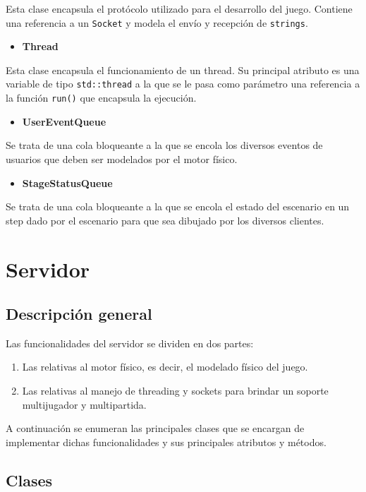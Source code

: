 \documentclass[a4paper]{article}
\begin{document}
Esta clase encapsula el protócolo utilizado para el desarrollo del juego. Contiene una referencia a un \texttt{Socket} y modela el envío y recepción de \texttt{strings}.

\begin{itemize}
	\item \textbf{Thread}
\end{itemize}

Esta clase encapsula el funcionamiento de un thread. Su principal atributo es una variable de tipo \texttt{std::thread} a la que se le pasa como parámetro una
referencia a la función \texttt{run()} que encapsula la ejecución.

\begin{itemize}
	\item \textbf{UserEventQueue}
\end{itemize}

Se trata de una cola bloqueante a la que se encola los diversos eventos de usuarios que deben ser modelados por el motor físico.

\begin{itemize}
	\item \textbf{StageStatusQueue}
\end{itemize}

Se trata de una cola bloqueante a la que se encola el estado del escenario en un step dado por el escenario para que sea dibujado por los diversos clientes.

\section{Servidor}

\subsection{Descripción general}
Las funcionalidades del servidor se dividen en dos partes:
\begin{enumerate}
	\item Las relativas al motor físico, es decir, el modelado físico del juego.
	\item Las relativas al manejo de threading y sockets para brindar un soporte multijugador y multipartida.
\end{enumerate}

A continuación se enumeran las principales clases que se encargan de implementar dichas funcionalidades y sus principales atributos y métodos.

\subsection{Clases}
\end{document}
